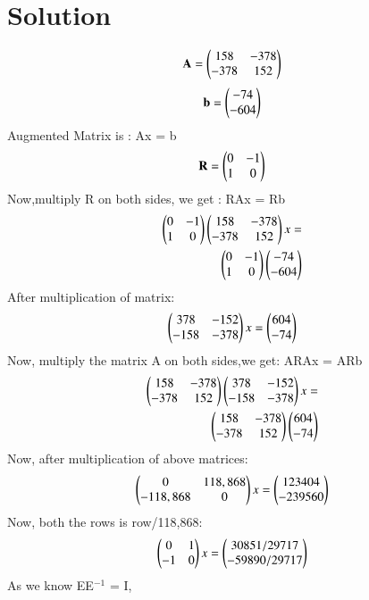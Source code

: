 \documentclass[journal,12pt,twocolumn]{IEEEtran}
\begin{document}
\section{Solution}
\begin{align}
\mathbf{A} = \begin{pmatrix}158 & -378 \\ -378 & 152\end{pmatrix}
\end{align}
\begin{align}
\mathbf{b} = \begin{pmatrix}-74 \\ -604\end{pmatrix}
\end{align}
Augmented Matrix is : Ax = b
\begin{align}
\mathbf{R} = \begin{pmatrix}  0 & -1 \\
1 & 0\end{pmatrix}
\end{align}
Now,multiply R on both sides, we get :
RAx = Rb
\begin{align}
\begin{pmatrix}0 & -1 \\ 1 & 0\end{pmatrix}
\begin{pmatrix}158 & -378 \\ -378 & 152\end{pmatrix} x = \nonumber \\
\begin{pmatrix}0 & -1 \\ 1 & 0\end{pmatrix}
\begin{pmatrix}-74 \\ -604\end{pmatrix}
\end{align}
After multiplication of matrix:
\begin{align}
\begin{pmatrix}378 & -152 \\ -158 & -378\end{pmatrix} x =
\begin{pmatrix}604 \\ -74\end{pmatrix}
\end{align}
Now, multiply the matrix A on both sides,we get:
ARAx = ARb
\begin{align}
\begin{pmatrix}158 & -378 \\ -378 & 152\end{pmatrix}
\begin{pmatrix}378 & -152 \\ -158 & -378\end{pmatrix} x = \nonumber \\
\begin{pmatrix}158 & -378 \\ -378 & 152\end{pmatrix}
\begin{pmatrix}604 \\ -74\end{pmatrix}
\end{align}
Now, after multiplication of above matrices:
\begin{align}
\begin{pmatrix}0 & 118,868 \\ -118,868 & 0 \end{pmatrix} x =
\begin{pmatrix}123404 \\ -239560 \end{pmatrix}
\end{align}
Now, both the rows is row/118,868:
\begin{align}
\begin{pmatrix}0 & 1 \\ -1 & 0\end{pmatrix} x = \begin{pmatrix}30851/29717 \\ -59890/29717\end{pmatrix}
\end{align}
As we know EE$^ {-1}$ = I,
\end{document}
